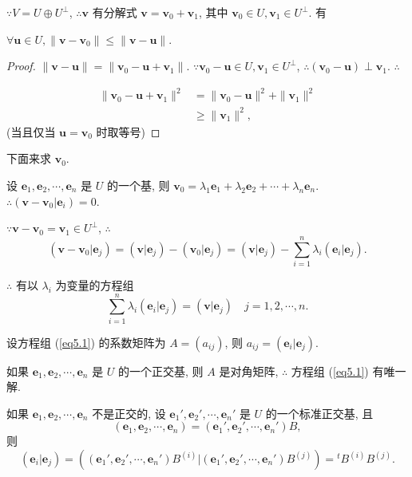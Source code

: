 \documentclass[color=black,device=normal,lang=cn,mode=geye]{elegantnote}
\begin{document}
$\because V=U\oplus U^\perp$, $\therefore\boldsymbol{v}$ 有分解式 $\boldsymbol{v}=\boldsymbol{v}_0+\boldsymbol{v}_1$, 其中 $\boldsymbol{v}_0\in U,\boldsymbol{v}_1\in U^\perp$. 有
\begin{theorem}\label{t5.1}
    $\forall\boldsymbol{u}\in U,\|\boldsymbol{v}-\boldsymbol{v}_0\|\leq\|\boldsymbol{v}-\boldsymbol{u}\|$.
\end{theorem}
\begin{proof}
    $\|\boldsymbol{v}-\boldsymbol{u}\|=\|\boldsymbol{v}_0-\boldsymbol{u}+\boldsymbol{v}_1\|$. $\because\boldsymbol{v}_0-\boldsymbol{u}\in U,\boldsymbol{v}_1\in U^\perp$, $\therefore(\boldsymbol{v}_0-\boldsymbol{u})\perp\boldsymbol{v}_1$. $\therefore$

    \begin{align*}
        \|\boldsymbol{v}_0-\boldsymbol{u}+\boldsymbol{v}_1\|^2 & =\|\boldsymbol{v}_0-\boldsymbol{u}\|^2+\|\boldsymbol{v}_1\|^2 \\
        & \geq\|\boldsymbol{v}_1\|^2,
    \end{align*}
    (当且仅当 $\boldsymbol{u}=\boldsymbol{v}_0$ 时取等号)
\end{proof}
下面来求 $\boldsymbol{v}_0$.

设 $\boldsymbol{e}_1,\boldsymbol{e}_2,\cdots,\boldsymbol{e}_n$ 是 $U$ 的一个基, 则 $\boldsymbol{v}_0=\lambda_1\boldsymbol{e}_1+\lambda_2\boldsymbol{e}_2+\cdots+\lambda_n\boldsymbol{e}_n$. $\therefore(\boldsymbol{v}-\boldsymbol{v}_0|\boldsymbol{e}_i)=0$.

$\because\boldsymbol{v}-\boldsymbol{v}_0=\boldsymbol{v}_1\in U^\perp$, $\therefore$
\[(\boldsymbol{v}-\boldsymbol{v}_0|\boldsymbol{e}_j)=(\boldsymbol{v}|\boldsymbol{e}_j)-(\boldsymbol{v}_0|\boldsymbol{e}_j)=(\boldsymbol{v}|\boldsymbol{e}_j)-\sum\limits_{i=1}^n\lambda_i(\boldsymbol{e}_i|\boldsymbol{e}_j).\]

$\therefore$ 有以 $\lambda_i$ 为变量的方程组
\begin{equation}\label{eq5.1}
    \sum\limits_{i=1}^n\lambda_i(\boldsymbol{e}_i|\boldsymbol{e}_j)=(\boldsymbol{v}|\boldsymbol{e}_j)\quad j=1,2,\cdots,n.
\end{equation}

设方程组 (\ref{eq5.1}) 的系数矩阵为 $A=(a_{ij})$, 则 $a_{ij}=(\boldsymbol{e}_i|\boldsymbol{e}_j)$.

如果 $\boldsymbol{e}_1,\boldsymbol{e}_2,\cdots,\boldsymbol{e}_n$ 是 $U$ 的一个正交基, 则 $A$ 是对角矩阵, $\therefore$ 方程组 (\ref{eq5.1}) 有唯一解.

如果 $\boldsymbol{e}_1,\boldsymbol{e}_2,\cdots,\boldsymbol{e}_n$ 不是正交的, 设 $\boldsymbol{e}_1',\boldsymbol{e}_2',\cdots,\boldsymbol{e}_n'$ 是 $U$ 的一个标准正交基, 且
\[(\boldsymbol{e}_1,\boldsymbol{e}_2,\cdots,\boldsymbol{e}_n)=(\boldsymbol{e}_1',\boldsymbol{e}_2',\cdots,\boldsymbol{e}_n')B,\]
则
\[(\boldsymbol{e}_i|\boldsymbol{e}_j)=\left((\boldsymbol{e}_1',\boldsymbol{e}_2',\cdots,\boldsymbol{e}_n')B^{(i)}\Big|(\boldsymbol{e}_1',\boldsymbol{e}_2',\cdots,\boldsymbol{e}_n')B^{(j)}\right)={}^tB^{(i)}B^{(j)}.\]
\end{document}
